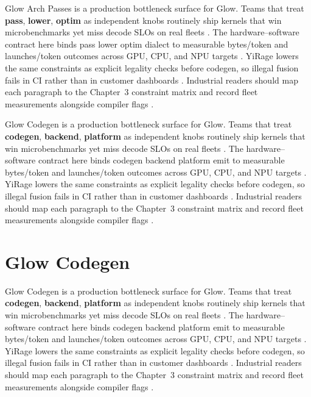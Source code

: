 Glow Arch Passes is a production bottleneck surface for Glow. Teams that treat \textbf{pass}, \textbf{lower}, \textbf{optim} as independent knobs routinely ship kernels that win microbenchmarks yet miss decode SLOs on real fleets \citep{patel2025llminference,nvidia2022hopper}. The hardware--software contract here binds pass lower optim dialect to measurable bytes/token and launches/token outcomes across GPU, CPU, and NPU targets \citep{taxbreak2026,semianalysis2024tma}. YiRage lowers the same constraints as explicit legality checks before codegen, so illegal fusion fails in CI rather than in customer dashboards \citep{memoryfloor2026,amd2024xdna}. Industrial readers should map each paragraph to the Chapter~3 constraint matrix and record fleet measurements alongside compiler flags \citep{nvidia2022hopper,amd2024aie}.

Glow Codegen is a production bottleneck surface for Glow. Teams that treat \textbf{codegen}, \textbf{backend}, \textbf{platform} as independent knobs routinely ship kernels that win microbenchmarks yet miss decode SLOs on real fleets \citep{taxbreak2026,semianalysis2024tma}. The hardware--software contract here binds codegen backend platform emit to measurable bytes/token and launches/token outcomes across GPU, CPU, and NPU targets \citep{memoryfloor2026,amd2024xdna}. YiRage lowers the same constraints as explicit legality checks before codegen, so illegal fusion fails in CI rather than in customer dashboards \citep{nvidia2022hopper,amd2024aie}. Industrial readers should map each paragraph to the Chapter~3 constraint matrix and record fleet measurements alongside compiler flags \citep{semianalysis2024tma,dlbook}.

\section{Glow Codegen}
\label{sec:glow_codegen}

Glow Codegen is a production bottleneck surface for Glow. Teams that treat \textbf{codegen}, \textbf{backend}, \textbf{platform} as independent knobs routinely ship kernels that win microbenchmarks yet miss decode SLOs on real fleets \citep{memoryfloor2026,amd2024xdna}. The hardware--software contract here binds codegen backend platform emit to measurable bytes/token and launches/token outcomes across GPU, CPU, and NPU targets \citep{nvidia2022hopper,amd2024aie}. YiRage lowers the same constraints as explicit legality checks before codegen, so illegal fusion fails in CI rather than in customer dashboards \citep{semianalysis2024tma,dlbook}. Industrial readers should map each paragraph to the Chapter~3 constraint matrix and record fleet measurements alongside compiler flags \citep{amd2024xdna,dao2022flashattention}.

